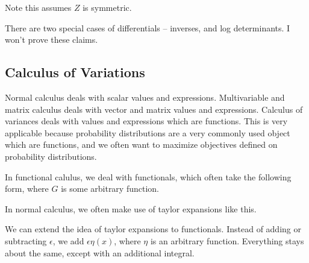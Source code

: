 \documentclass[12pt]{article}
\begin{document}

Note this assumes $Z$ is symmetric.

There are two special cases of differentials -- inverses, and log determinants. I won't prove these claims.


\subsection{Calculus of Variations}

Normal calculus deals with scalar values and expressions. Multivariable and matrix calculus deals with vector and matrix values and expressions. Calculus of variances deals with values and expressions which are functions. This is very applicable because probability distributions are a very commonly used object which are functions, and we often want to maximize objectives defined on probability distributions.

In functional calulus, we deal with functionals, which often take the following form, where $G$ is some arbitrary function.


In normal calculus, we often make use of taylor expansions like this.


We can extend the idea of taylor expansions to functionals. Instead of adding or subtracting $\epsilon$, we add $\epsilon \eta(x)$, where $\eta$ is an arbitrary function. Everything stays about the same, except with an additional integral. 
\end{document}
